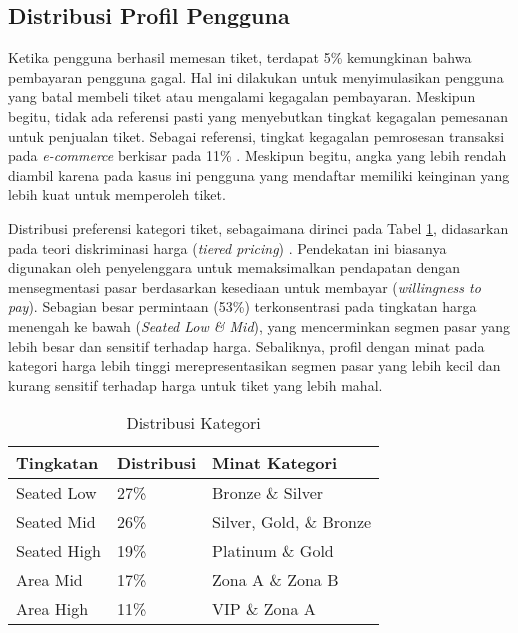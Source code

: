 \subsection{Distribusi Profil Pengguna}

Ketika pengguna berhasil memesan tiket, terdapat 5\% kemungkinan bahwa pembayaran pengguna gagal. Hal ini dilakukan untuk menyimulasikan pengguna yang batal membeli tiket atau mengalami kegagalan pembayaran. Meskipun begitu, tidak ada referensi pasti yang menyebutkan tingkat kegagalan pemesanan untuk penjualan tiket. Sebagai referensi, tingkat kegagalan pemrosesan transaksi pada \textit{e-commerce} berkisar pada 11\% \parencite{paymentFail}. Meskipun begitu, angka yang lebih rendah diambil karena pada kasus ini pengguna yang mendaftar memiliki keinginan yang lebih kuat untuk memperoleh tiket.

Distribusi preferensi kategori tiket, sebagaimana dirinci pada Tabel \ref{table:distribusi-kategori}, didasarkan pada teori diskriminasi harga (\textit{tiered pricing}) \parencite{acei2022}. Pendekatan ini biasanya digunakan oleh penyelenggara untuk memaksimalkan pendapatan dengan mensegmentasi pasar berdasarkan kesediaan untuk membayar (\textit{willingness to pay}). Sebagian besar permintaan (53\%) terkonsentrasi pada tingkatan harga menengah ke bawah (\textit{Seated Low \& Mid}), yang mencerminkan segmen pasar yang lebih besar dan sensitif terhadap harga. Sebaliknya, profil dengan minat pada kategori harga lebih tinggi merepresentasikan segmen pasar yang lebih kecil dan kurang sensitif terhadap harga untuk tiket yang lebih mahal.

\begin{table}[H]
    \centering
    \caption{Distribusi Kategori}
    \label{table:distribusi-kategori}
    \begin{tabular}{|l|l|l|}
        \hline
        \textbf{Tingkatan} & \textbf{Distribusi} & \textbf{Minat Kategori} \\
        \hline
        Seated Low         & 27\%                & Bronze \& Silver        \\
        \hline
        Seated Mid         & 26\%                & Silver, Gold, \& Bronze \\
        \hline
        Seated High        & 19\%                & Platinum \& Gold        \\
        \hline
        Area Mid           & 17\%                & Zona A \& Zona B        \\
        \hline
        Area High          & 11\%                & VIP \& Zona A           \\
        \hline
    \end{tabular}
\end{table}

